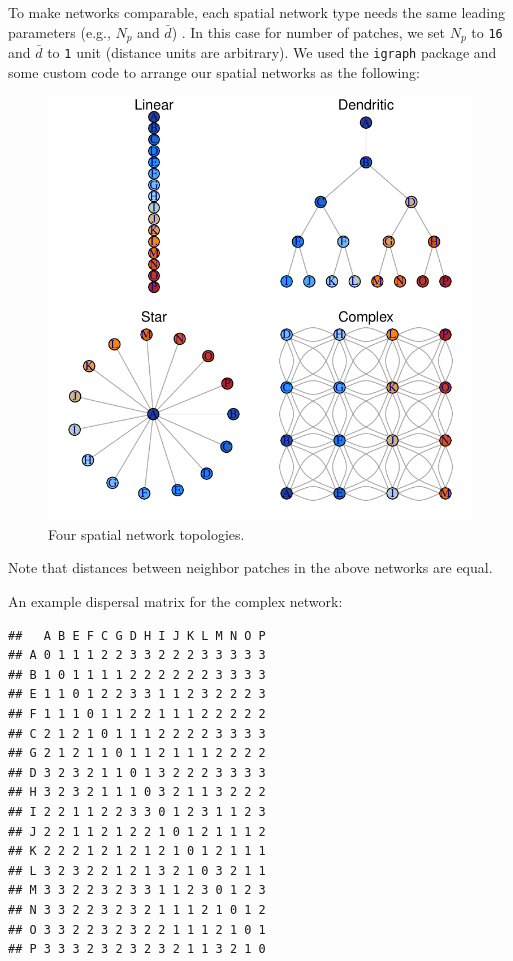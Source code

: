 \documentclass[]{article}
\begin{document}
To make networks comparable, each spatial network type needs the same
leading parameters (e.g., \(N_p\) and \(\bar{d}\)) . In this case for
number of patches, we set \(N_p\) to \texttt{16} and \(\bar{d}\) to
\texttt{1} unit (distance units are arbitrary). We used the
\texttt{igraph} package and some custom code to arrange our spatial
networks as the following:

\begin{figure}[H]

{\centering \includegraphics{Managing_for_ecological_surprises_in_metapopulations_makeHTML_files/figure-latex/networks-1} 

}

\caption{Four spatial network topologies.}\label{fig:networks}
\end{figure}

Note that distances between neighbor patches in the above networks are
equal.

An example dispersal matrix for the complex network:

\begin{verbatim}
##   A B E F C G D H I J K L M N O P
## A 0 1 1 1 2 2 3 3 2 2 2 3 3 3 3 3
## B 1 0 1 1 1 1 2 2 2 2 2 2 3 3 3 3
## E 1 1 0 1 2 2 3 3 1 1 2 3 2 2 2 3
## F 1 1 1 0 1 1 2 2 1 1 1 2 2 2 2 2
## C 2 1 2 1 0 1 1 1 2 2 2 2 3 3 3 3
## G 2 1 2 1 1 0 1 1 2 1 1 1 2 2 2 2
## D 3 2 3 2 1 1 0 1 3 2 2 2 3 3 3 3
## H 3 2 3 2 1 1 1 0 3 2 1 1 3 2 2 2
## I 2 2 1 1 2 2 3 3 0 1 2 3 1 1 2 3
## J 2 2 1 1 2 1 2 2 1 0 1 2 1 1 1 2
## K 2 2 2 1 2 1 2 1 2 1 0 1 2 1 1 1
## L 3 2 3 2 2 1 2 1 3 2 1 0 3 2 1 1
## M 3 3 2 2 3 2 3 3 1 1 2 3 0 1 2 3
## N 3 3 2 2 3 2 3 2 1 1 1 2 1 0 1 2
## O 3 3 2 2 3 2 3 2 2 1 1 1 2 1 0 1
## P 3 3 3 2 3 2 3 2 3 2 1 1 3 2 1 0
\end{verbatim}
\end{document}
